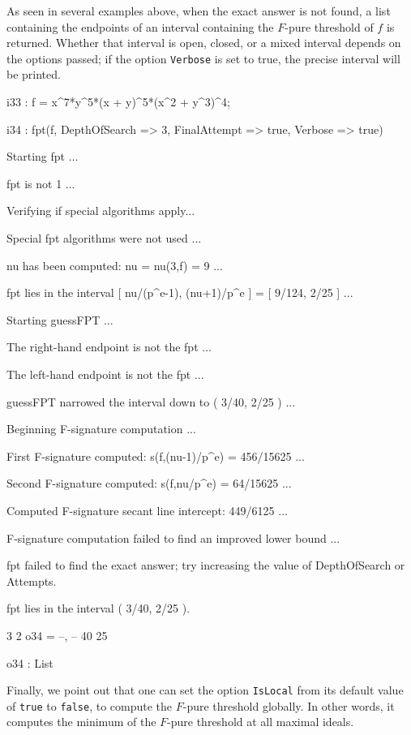 \documentclass{amsart}
\begin{document}
As seen in several examples above, when the exact answer is not found, a list containing the endpoints of an interval containing the $F$-pure threshold of $f$ is returned. Whether that interval is open, closed, or a mixed interval depends on the options passed; if the option {\tt Verbose} is set to true, the precise interval will be printed.
{\small
{}
\begin{MyVerbatim}

i33 : f = x^7*y^5*(x + y)^5*(x^2 + y^3)^4;

i34 : fpt(f, DepthOfSearch => 3, FinalAttempt => true, Verbose => true)

Starting fpt ...

fpt is not 1 ...

Verifying if special algorithms apply...

Special fpt algorithms were not used ...

nu has been computed: nu = nu(3,f) = 9 ...

fpt lies in the interval [ nu/(p^e-1), (nu+1)/p^e ] = [ 9/124, 2/25 ] ...

Starting guessFPT ...

The right-hand endpoint is not the fpt ...

The left-hand endpoint is not the fpt ...

guessFPT narrowed the interval down to ( 3/40, 2/25 ) ...

Beginning F-signature computation ...

First F-signature computed: s(f,(nu-1)/p^e) = 456/15625 ...

Second F-signature computed: s(f,nu/p^e) = 64/15625 ...

Computed F-signature secant line intercept: 449/6125 ...

F-signature computation failed to find an improved lower bound ...

fpt failed to find the exact answer; try increasing the value of 
DepthOfSearch or Attempts.

fpt lies in the interval ( 3/40, 2/25 ).

        3   2
o34 = {--, --}
       40  25

o34 : List
\end{MyVerbatim}
}
\medspace

Finally, we point out that one can set the option {\tt IsLocal} from its default value of {\tt true} to {\tt false}, to compute the $F$-pure threshold globally. In other words, it computes the minimum of the $F$-pure threshold at all maximal ideals.
\end{document}

